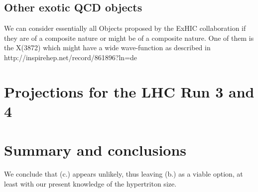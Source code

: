 \documentclass[a4paper,11pt]{scrartcl} %
\begin{document}
\subsection{Other exotic QCD objects}

We can consider essentially all Objects proposed by the ExHIC collaboration if they are of a composite nature or might be of a composite nature. One of them is the X(3872) which might have a wide wave-function as described in http://inspirehep.net/record/861896?ln=de

\section{Projections for the LHC Run 3 and 4}\label{sec:projections}

\section{Summary and conclusions}

We conclude that (c.) appears unlikely, thus leaving (b.) as a viable option, at least with our present knowledge of the hypertriton size.
\end{document}
